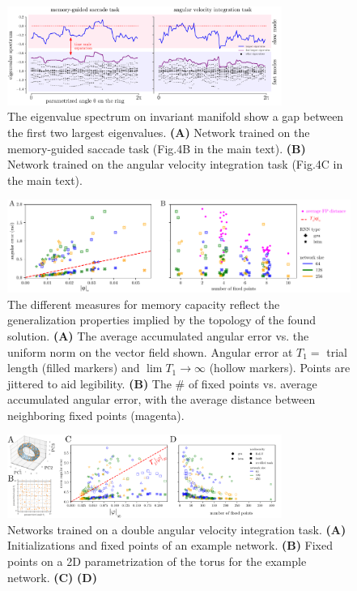 \documentclass[letterpaper]{article}
\begin{document}
\begin{figure}[tbhp]
  \centering
  \includegraphics[width=0.8\textwidth]{eigenvalue_gap}
  \caption{The eigenvalue spectrum on invariant manifold show a gap between the first two largest eigenvalues.
    \textbf{(A)} Network trained on the memory-guided saccade task (Fig.4B in the main text).
    \textbf{(B)} Network trained on the angular velocity integration task (Fig.4C in the main text).
}\label{fig:eigenvalue_gap}
\end{figure}


\begin{figure}[tbhp]
  \centering
  \includegraphics[width=\textwidth]{angular_losses_lstm_gru}
  \caption{The different measures for memory capacity reflect the generalization properties implied by the topology of the found solution.
    \textbf{(A)} The average accumulated angular error vs. the uniform norm on the vector field shown.
     Angular error at \(T_1 =\) trial length (filled markers) and \(\lim T_{1} \to \infty\)  (hollow markers).
      Points are jittered to aid legibility.
    \textbf{(B)}  The \# of fixed points vs. average accumulated angular error, with the average distance between neighboring fixed points (magenta).
}\label{fig:angular_losses_lstm_gru}
\end{figure}


\begin{figure}[tbhp]
  \centering
  \includegraphics[width=0.8\textwidth]{davit}
  \caption{Networks trained on a double angular velocity integration task.
    \textbf{(A)} Initializations and fixed points of an example network.
    \textbf{(B)} Fixed points on a 2D parametrization of the torus for the example network.
    \textbf{(C)}
    \textbf{(D)}
}\label{fig:davit}
\end{figure}
\end{document}
